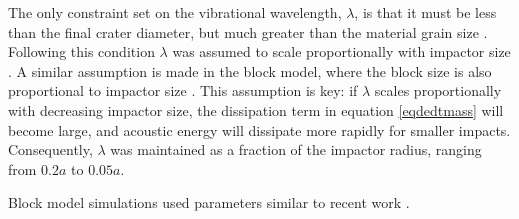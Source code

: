 The only constraint set on the vibrational wavelength, $\lambda$, is that it must be less than the final crater diameter, but much greater than the material grain size \citep{melosh1979acoustic,collins2002numerical}. Following this condition $\lambda$ was assumed to scale proportionally with impactor size \citep{collins2003acoustic}. A similar assumption is made in the block model, where the block size is also proportional to impactor size \citep{ivanov1997block}. This assumption is key: if $\lambda$ scales proportionally with decreasing impactor size, the dissipation term in equation \ref{eqdedtmass} will become large, and acoustic energy will dissipate more rapidly for smaller impacts. Consequently, $\lambda$ was maintained as a fraction of the impactor radius, ranging from $0.2a$ to $0.05a$.

Block model simulations used parameters similar to recent work \citetext{e.g., \citet{wunnemann2003numerical}}. 
